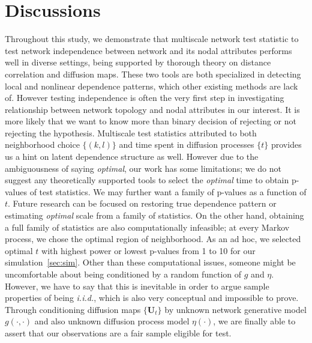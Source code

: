 \documentclass[12pt]{article}
\theoremstyle{definition}
\begin{document}
\section{Discussions}
\label{sec:discussion}
	
Throughout this study, we demonstrate that multiscale network test statistic to test network independence between network and its nodal attributes performs well in diverse settings, being supported by thorough theory on distance correlation and diffusion maps. These two tools are both specialized in detecting local and nonlinear dependence patterns, which other existing methods are lack of. However testing independence is often the very first step in investigating relationship between network topology and nodal attributes in our interest. It is more likely that we want to know more than binary decision of rejecting or not rejecting the hypothesis. Multiscale test statistics attributed to both neighborhood choice $\{ (k,l)  \}$ and time spent in diffusion processes $\{ t \}$ provides us a hint on latent dependence structure as well.  However due to the ambiguousness of saying \textit{optimal}, our work has some limitations; we do not suggest any theoretically supported tools to select the \textit{optimal} time to obtain p-values of test statistics. We may further want a family of p-values as a function of $t$. Future research can be focused on restoring true dependence pattern or estimating \textit{optimal} scale from a family of statistics. On the other hand, obtaining a full family of statistics are also computationally infeasible; at every Markov process, we chose the optimal region of neighborhood. As an ad hoc, we selected optimal $t$ with highest power or lowest p-values from 1 to 10 for our simulation~\ref{sec:sim}.  Other than these computational issues, someone might be uncomfortable about being conditioned by a random function of $g$ and $\eta$.  However, we have to say that this is inevitable in order to argue sample properties of being \textit{i.i.d.}, which is also very conceptual and impossible to prove. Through conditioning diffusion maps $\{ \mathbf{U}_{t} \}$ by unknown network generative model $g(\cdot, \cdot)$ and also unknown diffusion process model $\eta(\cdot)$, we are finally able to assert that our observations are a fair sample eligible for test. 
	
\end{document}
